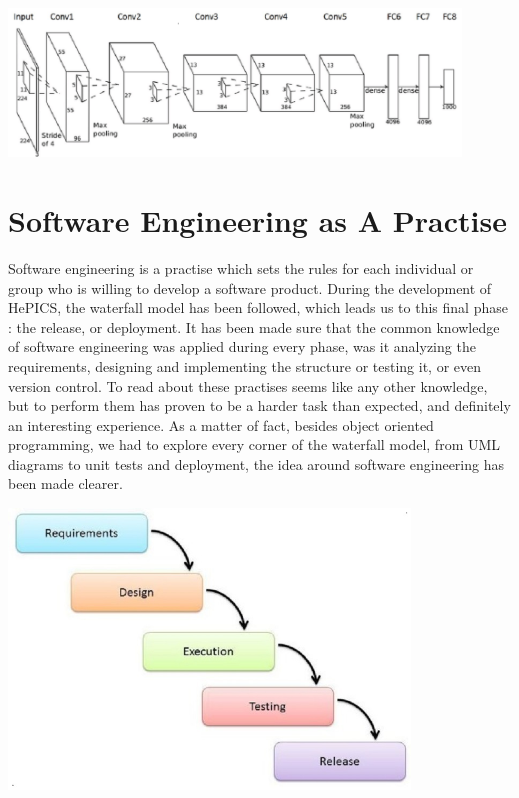 \documentclass[parskip=full]{scrartcl}
\begin{document}
\includegraphics[width=0.9\textwidth, center]{topology}


\pagebreak
 
\section {Software Engineering as A Practise}
Software engineering is a practise which sets the rules for each individual or group who is willing to develop a software product. During the development of HePICS, the waterfall model has been followed, which leads us to this final phase : the release, or deployment. It has been made sure that the common knowledge of software engineering was applied during every phase, was it analyzing the requirements, designing and implementing the structure or testing it, or even version control. To read about these practises seems like any other knowledge, but to perform them has proven to be a harder task than expected, and definitely an interesting experience. As a matter of fact, besides object oriented programming, we had to explore every corner of the waterfall model, from UML diagrams to unit tests and deployment, the idea around software engineering has been made clearer.


\includegraphics[width=0.80\textwidth, center]{swt}


\pagebreak
\end{document}
